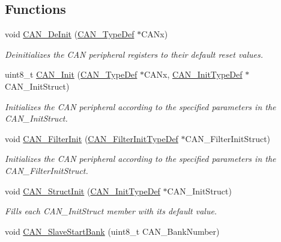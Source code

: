 \subsection*{Functions}
\begin{DoxyCompactItemize}
\item 
void \hyperlink{group___c_a_n___exported___functions_ga002b74cd69574a14b17ad445090245cd}{C\+A\+N\+\_\+\+De\+Init} (\hyperlink{struct_c_a_n___type_def}{C\+A\+N\+\_\+\+Type\+Def} $\ast$C\+A\+Nx)
\begin{DoxyCompactList}\small\item\em Deinitializes the C\+AN peripheral registers to their default reset values. \end{DoxyCompactList}\item 
uint8\+\_\+t \hyperlink{group___c_a_n___exported___functions_ga9023c35a9ab931ad4513fc5d19b4bd6c}{C\+A\+N\+\_\+\+Init} (\hyperlink{struct_c_a_n___type_def}{C\+A\+N\+\_\+\+Type\+Def} $\ast$C\+A\+Nx, \hyperlink{struct_c_a_n___init_type_def}{C\+A\+N\+\_\+\+Init\+Type\+Def} $\ast$C\+A\+N\+\_\+\+Init\+Struct)
\begin{DoxyCompactList}\small\item\em Initializes the C\+AN peripheral according to the specified parameters in the C\+A\+N\+\_\+\+Init\+Struct. \end{DoxyCompactList}\item 
void \hyperlink{group___c_a_n___exported___functions_ga39476830280340363c51041be6b12647}{C\+A\+N\+\_\+\+Filter\+Init} (\hyperlink{struct_c_a_n___filter_init_type_def}{C\+A\+N\+\_\+\+Filter\+Init\+Type\+Def} $\ast$C\+A\+N\+\_\+\+Filter\+Init\+Struct)
\begin{DoxyCompactList}\small\item\em Initializes the C\+AN peripheral according to the specified parameters in the C\+A\+N\+\_\+\+Filter\+Init\+Struct. \end{DoxyCompactList}\item 
void \hyperlink{group___c_a_n___exported___functions_gad77ad810868ed111755fc9e8ae0c7646}{C\+A\+N\+\_\+\+Struct\+Init} (\hyperlink{struct_c_a_n___init_type_def}{C\+A\+N\+\_\+\+Init\+Type\+Def} $\ast$C\+A\+N\+\_\+\+Init\+Struct)
\begin{DoxyCompactList}\small\item\em Fills each C\+A\+N\+\_\+\+Init\+Struct member with its default value. \end{DoxyCompactList}\item 
void \hyperlink{group___c_a_n___exported___functions_ga109ff8960bc59f44b984c9646f17b3c0}{C\+A\+N\+\_\+\+Slave\+Start\+Bank} (uint8\+\_\+t C\+A\+N\+\_\+\+Bank\+Number)

\end{DoxyCompactItemize}
